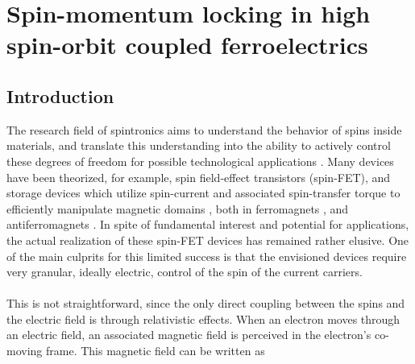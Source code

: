 \newcommand{\Unkr}{u_n(\bm{k}, \bm{r})}
\newcommand{\Eikr}{e^{i\bm{k}\cdot\bm{r}}}
\chapter{Spin-momentum locking in high spin-orbit coupled ferroelectrics \label{ch:Rashba}}
\section{Introduction}
%
The research field of spintronics aims to understand the behavior of spins inside materials, and translate this understanding into the ability to actively control these degrees of freedom for possible technological applications \cite{Joshi2016}.
Many devices have been theorized, for example, spin field-effect transistors (spin-FET)\cite{Datta1990}, and storage devices  which utilize spin-current and associated spin-transfer torque to efficiently manipulate magnetic domains \cite{Kent2015}, both in ferromagnets \cite{Nunez2011}, and antiferromagnets \cite{Nunez2006TheorySemiconductors,Nunez2006TheoryMetals, Jungwirth2016}.
In spite of fundamental interest and potential for applications, the actual realization of these spin-FET devices has remained rather elusive.
One of the main culprits for this limited success is that the envisioned devices require very granular, ideally electric, control of the spin of the current carriers.
\\\\
This is not straightforward, since the only direct coupling between the spins and the electric field is through relativistic effects. When an electron moves through an electric field, an associated magnetic field is perceived in the electron's co-moving frame. This magnetic field can be written as
